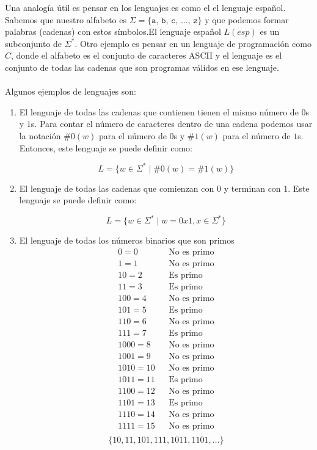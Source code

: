 Una analogía útil es pensar en los lenguajes es como el el lenguaje español. Sabemos que nuestro
alfabeto es $\Sigma = \{\texttt{a, b, c, \ldots, z}\}$ y que podemos formar palabras (cadenas) con estos símbolos.El 
lenguaje español $L(esp)$ es un subconjunto de $\Sigma^*$. Otro ejemplo es pensar en un lenguaje de programación como $C$, donde el alfabeto es el conjunto de caracteres ASCII y 
el lenguaje es el conjunto de todas las cadenas que son programas válidos en ese lenguaje.
\\ \\ 
Algunos ejemplos de lenguajes son:

\begin{enumerate}
    \item El lenguaje de todas las cadenas que contienen tienen el mismo número de $0$s y $1$s. Para contar el número de caracteres dentro 
    de una cadena podemos usar la notación $\#0(w)$ para el número de $0$s y $\#1(w)$ para el número de $1$s. Entonces, este lenguaje se puede definir como:

    $$L = \{w \in \Sigma^* \mid \#0(w) = \#1(w)\}$$

    \item El lenguaje de todas las cadenas que comienzan con $0$ y terminan con $1$. Este lenguaje se puede definir como:

    $$L = \{w \in \Sigma^* \mid w = 0x1, x \in \Sigma^*\}$$

    \item El lenguaje de todas los números binarios que son primos 
    \begin{align*}
        0  = 0 && \text{No es primo} \\ 
        1  = 1 && \text{No es primo} \\ 
        10 = 2 && \text{Es primo} \\ 
        11 = 3 && \text{Es primo} \\ 
        100 = 4 && \text{No es primo} \\ 
        101 = 5 && \text{Es primo} \\ 
        110 = 6 && \text{No es primo} \\ 
        111 = 7 && \text{Es primo} \\ 
        1000 = 8 && \text{No es primo} \\ 
        1001 = 9 && \text{No es primo} \\ 
        1010 = 10 && \text{No es primo} \\ 
        1011 = 11 && \text{Es primo} \\ 
        1100 = 12 && \text{No es primo} \\ 
        1101 = 13 && \text{Es primo} \\ 
        1110 = 14 && \text{No es primo} \\ 
        1111 = 15 && \text{No es primo} \\ 
    \end{align*}
    $$\{10, 11, 101, 111, 1011, 1101, \dots\}$$


\end{enumerate}
